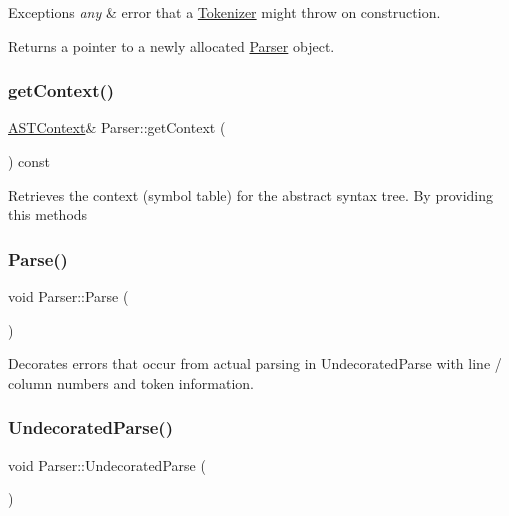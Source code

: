 \begin{DoxyExceptions}{Exceptions}
{\em any} & error that a \mbox{\hyperlink{class_tokenizer}{Tokenizer}} might throw on construction. \\
\hline
\end{DoxyExceptions}
\begin{DoxyReturn}{Returns}
a pointer to a newly allocated \mbox{\hyperlink{class_parser}{Parser}} object. 
\end{DoxyReturn}
\mbox{\label{class_parser_a65b2904aef56312309daed77baa619fa}} 
\subsubsection{\texorpdfstring{getContext()}{getContext()}}
{\footnotesize\ttfamily \mbox{\hyperlink{class_a_s_t_context}{A\+S\+T\+Context}}\& Parser\+::get\+Context (\begin{DoxyParamCaption}{ }\end{DoxyParamCaption}) const}

Retrieves the context (symbol table) for the abstract syntax tree. By providing this methods \mbox{\label{class_parser_aa55266b2875ee4ab02f8b311a56e7fc3}} 
\subsubsection{\texorpdfstring{Parse()}{Parse()}}
{\footnotesize\ttfamily void Parser\+::\+Parse (\begin{DoxyParamCaption}{ }\end{DoxyParamCaption})}

Decorates errors that occur from actual parsing in {\ttfamily Undecorated\+Parse} with line / column numbers and token information. \mbox{\label{class_parser_ad0aa1454babab9d013c7e681318b5750}} 
\subsubsection{\texorpdfstring{UndecoratedParse()}{UndecoratedParse()}}
{\footnotesize\ttfamily void Parser\+::\+Undecorated\+Parse (\begin{DoxyParamCaption}{ }\end{DoxyParamCaption})}

